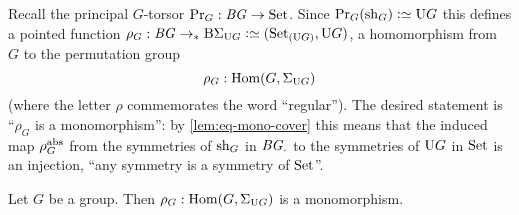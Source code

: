 Recall the principal $G$-torsor $\mathrm{Pr}_{{G}}:\mathit{B}\mathit{G}\to\mathrm{Set}$.
Since $\princ G(\sh_G)\defequi \USym G$ this defines a pointed function $\rho_G:\BG\to_* \BSigma_{\USym G}\defequi(\conncomp \Set {\USym G},\USym G)$, \ie a homomorphism from $G$ to the permutation group
$$\rho_G:\Hom(G,\Sigma_{\USym G})$$
(where the letter $\rho$ commemorates the word ``regular'').
The desired statement is ``$\rho_G$ is a monomorphism'': by \cref{lem:eq-mono-cover} this means that the induced map $\rho_G^{\mathrm{abs}}$ from the symmetries of $\mathrm{sh}_G$ in $\BG_\div$ to the symmetries of $\mathrm{U} G$ in $\mathrm{Set}$ is an injection, \ie ``any symmetry is a symmetry of $\mathrm{Set}$''.

\begin{lemma}
  \label{lem:allgpsarepermutationgps}Let $G$ be a group. Then
  $\rho_G:\Hom(G,\Sigma_{\USym G})  $ is a monomorphism.
\end{lemma}
